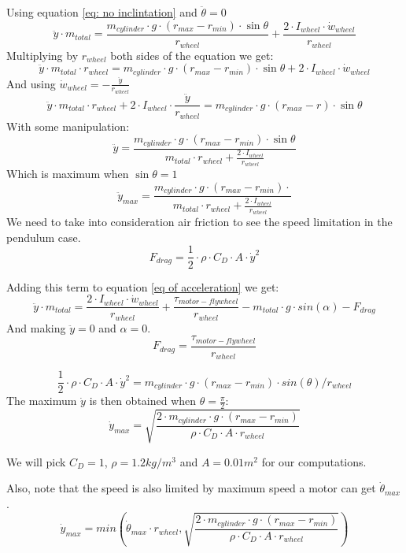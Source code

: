 \begin{enumerate}
    Using equation \ref{eq: no inclintation} and $\ddot{\theta} = 0$
    \[\ddot{y}\cdot m_{total} = \frac{m_{cylinder} \cdot  g \cdot  (r_{max} - r_{min}) \cdot  \sin{\theta}}{r_{wheel}} +\frac{2\cdot I_{wheel} \cdot  \dot{w}_{wheel}}{r_{wheel}}\]
    Multiplying by $r_{wheel}$ both sides of the equation we get:
    \[\ddot{y}\cdot m_{total} \cdot  r_{wheel} = m_{cylinder} \cdot  g \cdot  (r_{max}-r_{min}) \cdot  \sin{\theta} + 2\cdot I_{wheel} \cdot  \dot{w}_{wheel}\]
    And using $\dot{w}_{wheel} = -\frac{\ddot{y}}{r_{wheel}}$
    \[\ddot{y}\cdot m_{total} \cdot  r_{wheel} + 2\cdot  I_{wheel} \cdot  \frac{\ddot{y}}{r_{wheel}} = m_{cylinder} \cdot  g \cdot  (r_{max}-r) \cdot  \sin{\theta} \]
    With some manipulation:
    \[\ddot{y}  = \frac{m_{cylinder} \cdot  g \cdot  (r_{max}-r_{min}) \cdot  \sin{\theta}}{m_{total} \cdot  r_{wheel} + \frac{2\cdot I_{wheel}}{r_{wheel}} }  \]
    Which is maximum when $\sin{\theta}=1$
    \begin{equation}
        \boxed{ \ddot{y}_{max}  = \frac{m_{cylinder} \cdot  g \cdot  (r_{max}-r_{min}) \cdot}{m_{total} \cdot  r_{wheel} + \frac{2\cdot I_{wheel}}{r_{wheel}} } }
        \label{maximum acceleration pendulum}
    \end{equation}
    We need to take into consideration air friction to see the speed limitation in the pendulum case.
    \[F_{drag} = \frac{1}{2}\cdot \rho\cdot C_D \cdot  A \cdot  \dot{y}^2 \]

    Adding this term to equation \ref{eq of acceleration} we get:
    \[  \ddot{y}\cdot m_{total} = \frac{2\cdot I_{wheel} \cdot  \dot{w}_{wheel}}{r_{wheel}} + \frac{\tau_{motor-flywheel}}{r_{wheel}} - m_{total} \cdot  g \cdot  sin(\alpha) - F_{drag} \]
    And making $\ddot{y} = 0$ and $\alpha = 0$.
    \[  F_{drag} = \frac{\tau_{motor-flywheel}}{r_{wheel}}\]

    \[\frac{1}{2}\cdot \rho\cdot C_D \cdot  A \cdot  \dot{y}^2 = m_{cylinder} \cdot  g \cdot  (r_{max} - r_{min})\cdot sin(\theta) / r_{wheel} \]
    The maximum $\dot{y}$ is then obtained when $\theta=\frac{\pi}{2}$:
    \begin{equation*}
        \dot{y}_{max} = \sqrt{\frac{2\cdot m_{cylinder} \cdot  g \cdot  (r_{max} - r_{min})}{\rho\cdot C_D \cdot  A \cdot  r_{wheel}} }
    \end{equation*}

    We will pick $C_D=1$, $\rho=1.2 kg/m^3$ and $A=0.01 m^2$ for our computations.

    Also, note that the speed is also limited by maximum speed a motor can get
    $\dot{\theta}_{max}$.
    \begin{equation}
        \boxed{\dot{y}_{max} = min(\dot{\theta}_{max}\cdot r_{wheel}, \sqrt{\frac{2\cdot m_{cylinder} \cdot  g \cdot  (r_{max} - r_{min})}{\rho\cdot C_D \cdot  A \cdot  r_{wheel}} })}
        \label{maximum speed pendulum}
    \end{equation}


\end{enumerate}
